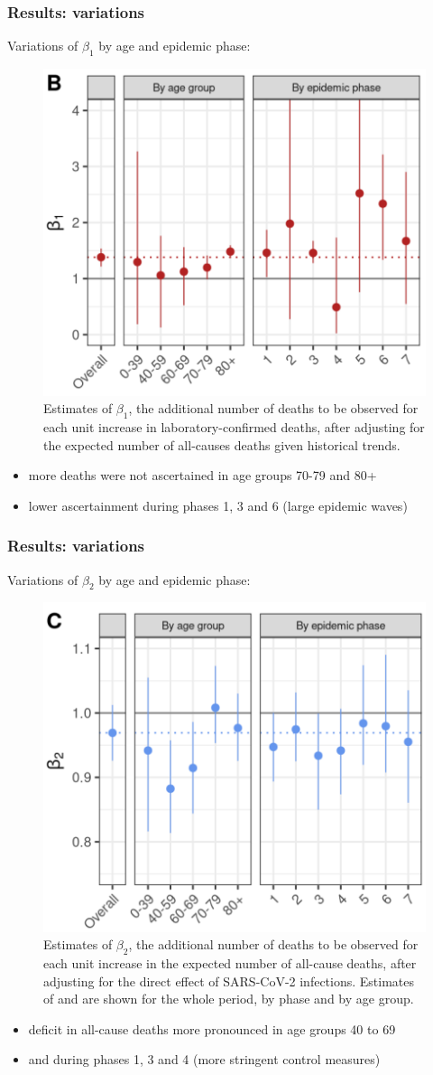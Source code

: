 \documentclass[10pt]{beamer}
\begin{document}
\begin{frame}
	\frametitle{Results: variations}
	Variations of $\beta_1$ by age and epidemic phase:
	\begin{figure}[t]
		\includegraphics[width=.45\linewidth ]{figures/fig3b.png}
		\caption{Estimates of $\beta_1$, the additional number of deaths to be observed for each unit increase in laboratory-confirmed deaths, after adjusting for the expected number of all-causes deaths given historical trends.}
	\end{figure}
	\begin{itemize}
	\item more deaths were not ascertained in \alert{age groups 70-79 and 80+}
	\item lower ascertainment during phases 1, 3 and 6 (\alert{large epidemic waves})
\end{itemize}
\end{frame}

\begin{frame}
	\frametitle{Results: variations}
	Variations of  $\beta_2$  by age and epidemic phase:
	\begin{figure}[t]
		\includegraphics[width=.45\linewidth ]{figures/fig3c.png}
	\caption{ Estimates of $\beta_2$, the additional number of deaths to be observed for each unit increase in the expected number of all-cause deaths, after adjusting for the direct effect of SARS-CoV-2 infections. Estimates of  and  are shown for the whole period, by phase and by age group.}

	\end{figure}
	\begin{itemize}
		\item deficit in all-cause deaths more pronounced in \alert{age groups 40 to 69}
		\item and during phases 1, 3 and 4 (more stringent control measures)
	\end{itemize}
\end{frame}
\end{document}
